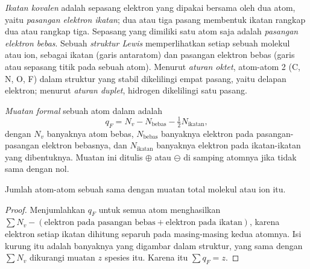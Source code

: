 \begin{definition}\label{def:b1:lewis-resonance-vsepr:lewis}
\emph{Ikatan kovalen} adalah sepasang elektron yang
dipakai bersama oleh dua atom, yaitu \emph{pasangan elektron
ikatan}; dua atau tiga pasang membentuk
ikatan rangkap dua atau rangkap tiga. Sepasang  yang
dimiliki satu atom saja adalah \emph{pasangan elektron
bebas}. Sebuah \emph{struktur
Lewis} memperlihatkan setiap 
sebuah molekul atau ion, sebagai ikatan (garis antaratom) dan pasangan
elektron bebas (garis atau sepasang titik pada sebuah atom). Menurut
\emph{aturan oktet}, atom-atom  2 (C, N, O,
F) dalam struktur yang stabil dikelilingi empat pasang, yaitu delapan
elektron; menurut \emph{aturan duplet}, hidrogen
dikelilingi satu pasang.
\end{definition}

\begin{definition}\label{def:b1:lewis-resonance-vsepr:formal-charge}
\emph{Muatan formal} sebuah atom dalam  adalah
\[
  q_F = N_v - N_{\text{bebas}} - \tfrac12 N_{\text{ikatan}},
\]
dengan $N_v$ banyaknya  atom bebas, $N_{\text{bebas}}$
banyaknya elektron pada pasangan-pasangan elektron bebasnya, dan
$N_{\text{ikatan}}$ banyaknya elektron pada ikatan-ikatan yang
dibentuknya. Muatan ini ditulis $\oplus$ atau $\ominus$ di samping
atomnya jika tidak sama dengan nol.
\end{definition}

\begin{proposition}\label{prop:b1:lewis-resonance-vsepr:formal-sum}
Jumlah  atom-atom sebuah  sama dengan muatan
total molekul atau ion itu.
\end{proposition}

\begin{proof}
Menjumlahkan $q_F$ untuk semua atom menghasilkan
$\sum N_v - (\text{elektron pada pasangan bebas} + \text{elektron pada ikatan})$,
karena elektron setiap ikatan dihitung separuh pada masing-masing kedua
atomnya. Isi kurung itu adalah banyaknya  yang digambar
dalam struktur, yang sama dengan $\sum N_v$ dikurangi muatan $z$ spesies
itu. Karena itu $\sum q_F = z$.
\end{proof}

